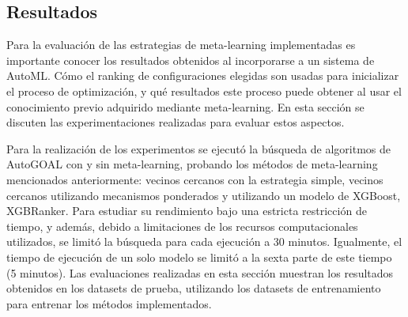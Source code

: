\documentclass[a4paper,12pt]{article}
\begin{document}
\subsection{Resultados}\label{subsec:resultados}

Para la evaluación de las estrategias de meta-learning implementadas es importante conocer los resultados obtenidos al incorporarse a un sistema de AutoML. Cómo el ranking de configuraciones elegidas son usadas para inicializar el proceso de optimización, y qué resultados este proceso puede obtener al usar el conocimiento previo adquirido mediante meta-learning. En esta sección se discuten las experimentaciones realizadas para evaluar estos aspectos.

Para la realización de los experimentos se ejecutó la búsqueda de algoritmos de AutoGOAL con y sin meta-learning, probando los métodos de meta-learning mencionados anteriormente: vecinos cercanos con la estrategia simple, vecinos cercanos utilizando mecanismos ponderados y utilizando un modelo de XGBoost, XGBRanker. Para estudiar su rendimiento bajo una estricta restricción de tiempo, y además, debido a limitaciones de los recursos computacionales utilizados, se limitó la búsqueda para cada ejecución a 30 minutos. Igualmente, el tiempo de ejecución de un solo modelo se limitó a la sexta parte de este tiempo (5 minutos). Las evaluaciones realizadas en esta sección muestran los resultados obtenidos en los datasets de prueba, utilizando los datasets de entrenamiento para entrenar los métodos implementados. %

\end{document}
